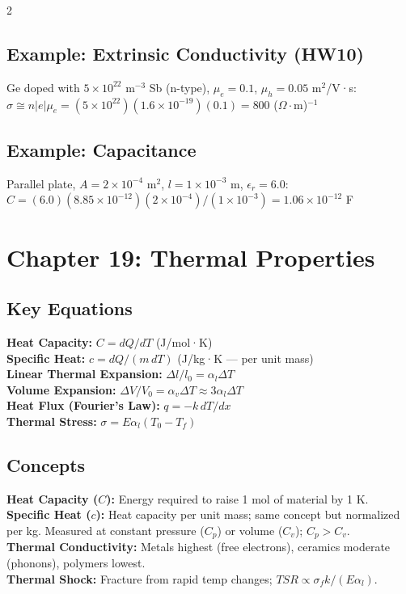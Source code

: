 \documentclass[8pt]{extarticle}
\begin{document}
\begin{multicols*}{2}
\subsection*{Example: Extrinsic Conductivity (HW10)}
Ge doped with $5\times10^{22}$ m$^{-3}$ Sb (n-type), $\mu_e=0.1$, $\mu_h=0.05$ m$^2$/V·s: \\
$\sigma \cong n|e|\mu_e = (5\times10^{22})(1.6\times10^{-19})(0.1) = 800$ ($\Omega\cdot$m)$^{-1}$
\subsection*{Example: Capacitance}
Parallel plate, $A=2\times10^{-4}$ m$^2$, $l=1\times10^{-3}$ m, $\epsilon_r=6.0$: \\
$C = (6.0)(8.85\times10^{-12})(2\times10^{-4})/(1\times10^{-3}) = 1.06\times10^{-12}$ F

\section*{Chapter 19: Thermal Properties}
\subsection*{Key Equations}
\textbf{Heat Capacity:} $C = dQ/dT$ (J/mol·K) \\
\textbf{Specific Heat:} $c = dQ/(m\,dT)$ (J/kg·K — per unit mass) \\
\textbf{Linear Thermal Expansion:} $\Delta l/l_0 = \alpha_l \Delta T$ \\
\textbf{Volume Expansion:} $\Delta V/V_0 = \alpha_v \Delta T \approx 3\alpha_l\Delta T$ \\
\textbf{Heat Flux (Fourier's Law):} $q = -k\,dT/dx$ \\
\textbf{Thermal Stress:} $\sigma = E\alpha_l(T_0 - T_f)$
\subsection*{Concepts}
\textbf{Heat Capacity ($C$):} Energy required to raise 1 mol of material by 1 K. \\
\textbf{Specific Heat ($c$):} Heat capacity per unit mass; same concept but normalized per kg. Measured at constant pressure ($C_p$) or volume ($C_v$); $C_p > C_v$. \\
\textbf{Thermal Conductivity:} Metals highest (free electrons), ceramics moderate (phonons), polymers lowest. \\
\textbf{Thermal Shock:} Fracture from rapid temp changes; $TSR \propto \sigma_f k/(E\alpha_l)$.


\end{multicols*}
\end{document}
